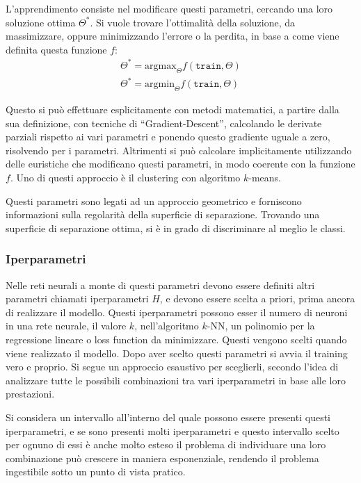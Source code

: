 \documentclass{article}
\numberwithin{equation}{subsection}
\begin{document}
L'apprendimento consiste nel modificare questi parametri, cercando una loro soluzione ottima $\Theta^*$. Si vuole trovare l'ottimalità della soluzione, da massimizzare, oppure 
minimizzando l'errore o la perdita, in base a come viene definita questa funzione $f$:
\begin{gather*}
    \Theta^*=\text{argmax}_\Theta f(\texttt{train},\Theta)\\
    \Theta^*=\text{argmin}_\Theta f(\texttt{train},\Theta)
\end{gather*}

Questo si può effettuare esplicitamente con metodi matematici, a partire dalla sua definizione, con tecniche di ``Gradient-Descent'', calcolando le derivate parziali rispetto 
ai vari parametri e ponendo questo gradiente uguale a zero, risolvendo per i parametri. 
Altrimenti si può calcolare implicitamente utilizzando delle euristiche che modificano questi parametri, in modo coerente con la funzione $f$. Uno di questi approccio è il 
clustering con algoritmo $k$-means. 

Questi parametri sono legati ad un approccio geometrico e forniscono informazioni sulla 
regolarità della superficie di separazione. Trovando una superficie di separazione ottima, 
si è in grado di discriminare al meglio le classi. 

\subsubsection{Iperparametri}

Nelle reti neurali a monte di questi parametri devono essere definiti altri parametri chiamati iperparametri $H$, e devono essere scelta a priori, prima ancora di realizzare il modello. 
Questi iperparametri possono esser il numero di neuroni in una rete neurale, il valore $k$, nell'algoritmo $k$-NN, un polinomio per la regressione lineare o loss function da minimizzare. 
Questi vengono scelti quando viene realizzato il modello. Dopo aver scelto questi parametri si avvia il training vero e proprio. 
Si segue un approccio esaustivo per sceglierli, secondo l'idea di analizzare tutte le possibili combinazioni tra vari iperparametri in base alle loro prestazioni. 

Si considera un intervallo all'interno del quale possono essere presenti questi iperparametri, e se sono presenti molti iperparametri e questo intervallo scelto per ognuno di essi è anche molto esteso il problema di individuare una loro combinazione può crescere in maniera esponenziale, rendendo il problema ingestibile sotto un punto di vista pratico. 
\end{document}
